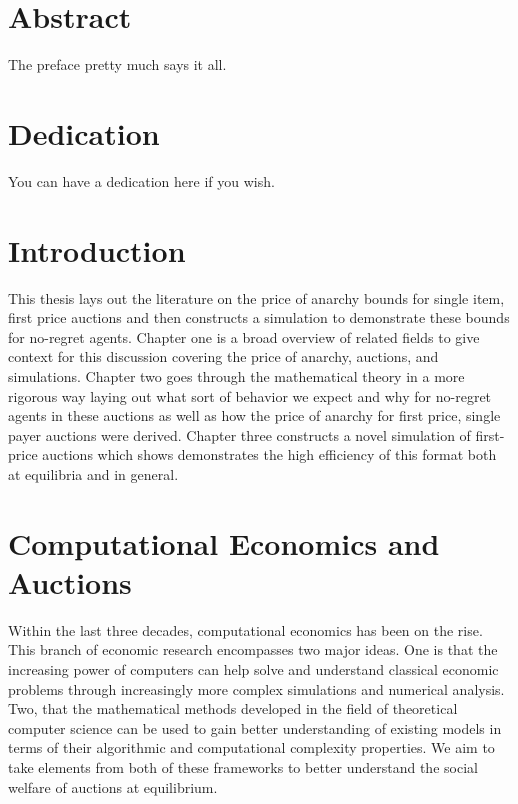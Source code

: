 \documentclass[12pt,twoside]{reedthesis}
\begin{document}
    \chapter*{Abstract}
	The preface pretty much says it all.
	
	\chapter*{Dedication}
	You can have a dedication here if you wish.

  \mainmatter %
  \pagestyle{fancyplain} %


    \chapter*{Introduction}

\doublespacing
	
	This thesis lays out the literature on the price of anarchy bounds for single item, first price auctions and then constructs
	 a simulation to demonstrate these bounds for no-regret agents. Chapter one is a broad overview of related fields to give context for this discussion covering the price of anarchy, auctions, and simulations. Chapter two goes through the mathematical theory in a more rigorous way laying out what sort of behavior we expect and why for no-regret agents in these auctions as well as how the price of anarchy for first price, single payer auctions were derived. Chapter three constructs a novel simulation of first-price auctions which shows demonstrates the high efficiency of this format both at equilibria and in general. 
	
\chapter{Computational Economics and Auctions}
	Within the last three decades, computational economics has been on the rise. This branch of economic research encompasses two major ideas. One is that the increasing power of computers can help solve and understand classical economic problems through increasingly more complex simulations and numerical analysis. Two, that the mathematical methods developed in the field of theoretical computer science can be used to gain better understanding of existing models in terms of their algorithmic and computational complexity properties. We aim to take elements from both of these frameworks to better understand the social welfare of auctions at equilibrium. 
\end{document}
